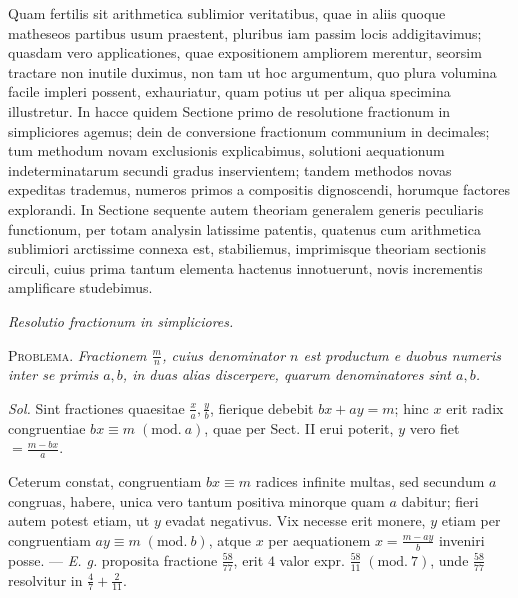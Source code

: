 Quam fertilis sit arithmetica sublimior veritatibus, quae in aliis quoque matheseos partibus usum praestent, pluribus iam passim locis addigitavimus; quasdam vero applicationes, quae expositionem ampliorem merentur, seorsim tractare non inutile duximus, non tam ut hoc argumentum, quo plura volumina facile impleri possent, exhauriatur, quam potius ut per aliqua specimina illustretur. In hacce quidem Sectione primo de resolutione fractionum in simpliciores agemus; dein de conversione fractionum communium in decimales; tum methodum novam exclusionis explicabimus, solutioni aequationum indeterminatarum secundi gradus inservientem; tandem methodos novas expeditas trademus, numeros primos a compositis dignoscendi, horumque factores explorandi. In Sectione sequente autem theoriam generalem generis peculiaris functionum, per totam analysin latissime patentis, quatenus cum arithmetica sublimiori arctissime connexa est, stabiliemus, imprimisque theoriam sectionis circuli, cuius prima tantum elementa hactenus innotuerunt, novis incrementis amplificare studebimus.

\begin{center}\textit{Resolutio fractionum in simpliciores.}\end{center}

\textsc{Problema.} \textit{Fractionem \(\frac mn\), cuius denominator \(n\) est productum e duobus numeris inter se primis \(a,b\), in duas alias discerpere, quarum denominatores sint \(a,b\).}

\textit{Sol.} Sint fractiones quaesitae \(\frac xa,\frac yb\), fierique debebit \(bx+ay=m\); hinc \(x\) erit radix congruentiae \(bx\equiv m\; (\mathrm{mod}.\ a)\), quae per Sect. II erui poterit, \(y\) vero fiet \(=\frac{m-bx}{a}\).

Ceterum constat, congruentiam \(bx\equiv m\) radices infinite multas, sed secundum \(a\) congruas, habere, unica vero tantum positiva minorque quam \(a\) dabitur; fieri autem potest etiam, ut \(y\) evadat negativus. Vix necesse erit monere, \(y\) etiam per congruentiam \(ay\equiv m\; (\mathrm{mod}.\ b)\), atque \(x\) per aequationem \(x=\frac{m-ay}{b}\) inveniri posse. — \textit{E. g.} proposita fractione \(\frac{58}{77}\), erit \(4\) valor expr. \(\frac{58}{11}\; (\mathrm{mod}.\ 7)\), unde \(\frac{58}{77}\) resolvitur in \(\frac47+\frac2{11}\).

